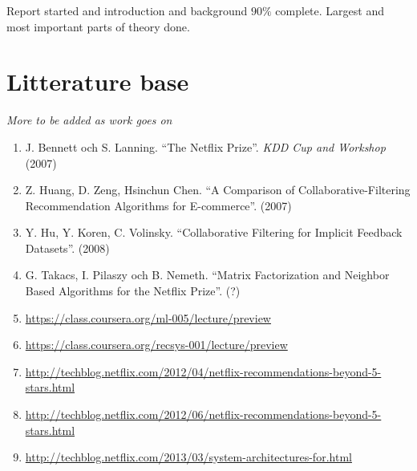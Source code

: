 \documentclass[11pt]{article}
\begin{document}
Report started and introduction and background $90\%$ complete. Largest and most important parts of theory done.

\newpage


\section*{Litterature base}

\textit{More to be added as work goes on}

\begin{enumerate}

    \item J. Bennett och S. Lanning. ``The Netflix Prize''. \textit{KDD Cup and Workshop} (2007)

    \item Z. Huang, D. Zeng, Hsinchun Chen. ``A Comparison of Collaborative-Filtering Recommendation Algorithms for E-commerce''. (2007)

    \item Y. Hu, Y. Koren, C.  Volinsky. ``Collaborative Filtering for Implicit Feedback Datasets''. (2008)

    \item G. Takacs, I. Pilaszy och B. Nemeth. ``Matrix Factorization and Neighbor Based Algorithms for the Netflix Prize''. (?)

    \item \url{https://class.coursera.org/ml-005/lecture/preview}
    \item \url{https://class.coursera.org/recsys-001/lecture/preview}

    \item \url{http://techblog.netflix.com/2012/04/netflix-recommendations-beyond-5-stars.html}
    \item \url{http://techblog.netflix.com/2012/06/netflix-recommendations-beyond-5-stars.html}
    \item \url{http://techblog.netflix.com/2013/03/system-architectures-for.html}


\end{enumerate}

\newpage
\end{document}
